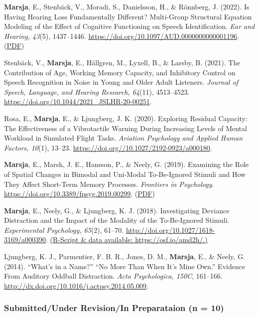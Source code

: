 \documentclass[]{article}
\begin{document}
\textbf{Marsja}, E., Stenbäck, V., Moradi, S., Danielsson, H., \&
Rönnberg, J. (2022). Is Having Hearing Loss Fundamentally Different?
Multi-Group Structural Equation Modeling of the Effect of Cognitive
Functioning on Speech Identification. \emph{Ear and Hearing, 43}(5),
1437--1446. \url{https://doi.org/10.1097/AUD.0000000000001196}.
(\href{https://tinyurl.com/eandhsem}{PDF})

Stenbäck, V., \textbf{Marsja}, E., Hällgren, M., Lyxell, B., \& Larsby,
B. (2021). The Contribution of Age, Working Memory Capacity, and
Inhibitory Control on Speech Recognition in Noise in Young and Older
Adult Listeners. \emph{Journal of Speech, Language, and Hearing
Research, 64}(11), 4513--4523.
\url{https://doi.org/10.1044/2021_JSLHR-20-00251}.

Rosa, E., \textbf{Marsja}, E., \& Ljungberg, J. K. (2020). Exploring
Residual Capacity: The Effectiveness of a Vibrotactile Warning During
Increasing Levels of Mental Workload in Simulated Flight Tasks.
\emph{Aviation Psychology and Applied Human Factors, 10}(1), 13--23.
\url{https://doi.org//10.1027/2192-0923/a000180}.

\textbf{Marsja}, E., Marsh, J. E., Hansson, P., \& Neely, G. (2019).
Examining the Role of Spatial Changes in Bimodal and Uni-Modal
To-Be-Ignored Stimuli and How They Affect Short-Term Memory Processes.
\emph{Frontiers in Psychology}.
\url{https://doi.org/10.3389/fpsyg.2019.00299}.
(\href{https://tinyurl.com/spativib}{PDF})

\textbf{Marsja}, E., Neely, G., \& Ljungberg, K. J. (2018).
Investigating Deviance Distraction and the Impact of the Modality of the
To-Be-Ignored Stimuli. \emph{Experimental Psychology, 65}(2), 61--70.
\url{http://doi.org/10.1027/1618-3169/a000390}.
\href{https://osf.io/amd2h/}{(R-Script \& data available:
https://osf.io/amd2h/.)}

Ljungberg, K. J., Parmentier, F. B. R., Jones, D. M., \textbf{Marsja},
E., \& Neely, G. (2014). ``What's in a Name?'' ``No More Than When It's
Mine Own.'' Evidence From Auditory Oddball Distraction. \emph{Acta
Psychologica, 150C}, 161--166.
\href{http://doi.org/10.1027/1618-3169/a000390}{http://dx.doi.org/10.1016/j.actpsy.2014.05.009}.

\subsubsection{Submitted/Under Revision/In Preparataion (n =
10)}\label{submittedunder-revisionin-preparataion-n-10}
\end{document}
